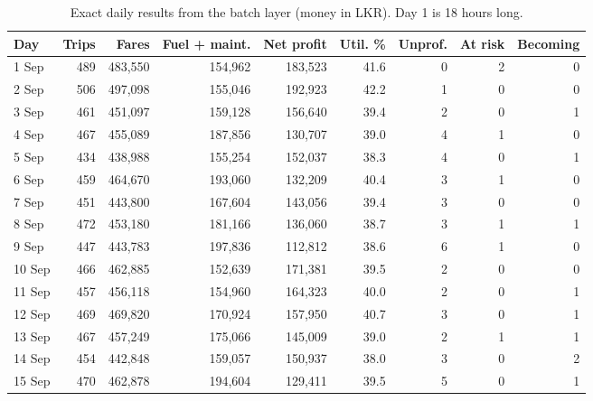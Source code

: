 \begin{table}[!htb]
\centering\small
\caption{Exact daily results from the batch layer (money in LKR). Day 1 is 18 hours long.}
\label{tab:daily}
\begin{tabular}{@{}lrrrrrrrr@{}}
\toprule
\textbf{Day} & \textbf{Trips} & \textbf{Fares} & \textbf{Fuel + maint.} & \textbf{Net profit} & \textbf{Util. \%} & \textbf{Unprof.} & \textbf{At risk} & \textbf{Becoming} \\
\midrule
1 Sep & 489 & 483,550 & 154,962 & 183,523 & 41.6 & 0 & 2 & 0 \\
2 Sep & 506 & 497,098 & 155,046 & 192,923 & 42.2 & 1 & 0 & 0 \\
3 Sep & 461 & 451,097 & 159,128 & 156,640 & 39.4 & 2 & 0 & 1 \\
4 Sep & 467 & 455,089 & 187,856 & 130,707 & 39.0 & 4 & 1 & 0 \\
5 Sep & 434 & 438,988 & 155,254 & 152,037 & 38.3 & 4 & 0 & 1 \\
6 Sep & 459 & 464,670 & 193,060 & 132,209 & 40.4 & 3 & 1 & 0 \\
7 Sep & 451 & 443,800 & 167,604 & 143,056 & 39.4 & 3 & 0 & 0 \\
8 Sep & 472 & 453,180 & 181,166 & 136,060 & 38.7 & 3 & 1 & 1 \\
9 Sep & 447 & 443,783 & 197,836 & 112,812 & 38.6 & 6 & 1 & 0 \\
10 Sep & 466 & 462,885 & 152,639 & 171,381 & 39.5 & 2 & 0 & 0 \\
11 Sep & 457 & 456,118 & 154,960 & 164,323 & 40.0 & 2 & 0 & 1 \\
12 Sep & 469 & 469,820 & 170,924 & 157,950 & 40.7 & 3 & 0 & 1 \\
13 Sep & 467 & 457,249 & 175,066 & 145,009 & 39.0 & 2 & 1 & 1 \\
14 Sep & 454 & 442,848 & 159,057 & 150,937 & 38.0 & 3 & 0 & 2 \\
15 Sep & 470 & 462,878 & 194,604 & 129,411 & 39.5 & 5 & 0 & 1 \\
\bottomrule
\end{tabular}
\end{table}

